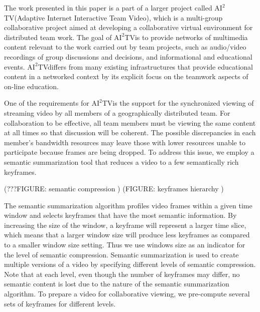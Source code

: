 \documentclass[10pt]{article}
\newcommand{\aiitv}[0]{$\mathrm{AI}^2$TV}
\begin{document}
The work presented in this paper is a part of a larger project called
\aiitv (Adaptive Internet Interactive Team Video), which is a
multi-group collaborative project aimed at developing a collaborative
virtual environment for distributed team work.  The goal of \aiitv is
to provide networks of multimedia content relevant to the work carried
out by team projects, such as audio/video recordings of group
discussions and decisions, and informational and educational events.
\aiitv differs from many existing infrastructures that provide
educational content in a networked context by its explicit focus on
the teamwork aspects of on-line education.


One of the requirements for \aiitv is the support for the synchronized
viewing of streaming video by all members of a geographically
distributed team.  For collaboration to be effective, all team members
must be viewing the same content at all times so that discussion will
be coherent.  The possible discrepancies in each member's bandwidth
resources may leave those with lower resources unable to participate
because frames are being dropped.  To address this issue, we employ a
semantic summarization tool \citep{TIECHENG} that reduces a video to a
few semantically rich keyframes.

(???FIGURE: semantic compression )
(FIGURE: keyframes hierarchy )

The semantic summarization algorithm profiles video frames within a
given time window and selects keyframes that have the most semantic
information.  By increasing the size of the window, a keyframe will
represent a larger time slice, which means that a larger window size
will produce less keyframes as compared to a smaller window size
setting.  Thus we use windows size as an indicator for the level of
semantic compression.  Semantic summarization is used to create
multiple versions of a video by specifying different levels of
semantic compression.  Note that at each level, even though the number
of keyframes may differ, no semantic content is lost due to the nature
of the semantic summarization algorithm.  To prepare a video for
collaborative viewing, we pre-compute several sets of keyframes for
different levels.
\end{document}
